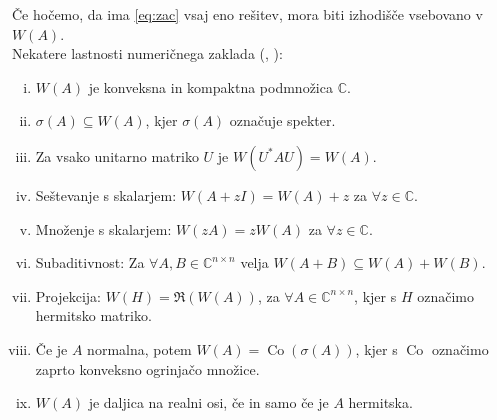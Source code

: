\documentclass[12pt,a4paper]{amsart}
\theoremstyle{definition}
\theoremstyle{plain}
\newcommand{\Co}{\operatorname{Co}} %
\newcommand{\C}{\mathbb C}
\begin{document}
Če hočemo, da ima \eqref{eq:zac} vsaj eno rešitev, mora biti izhodišče vsebovano v $W(A)$. \\

Nekatere lastnosti numeričnega zaklada (\cite{num}, \cite{zaloga}):
\begin{enumerate}[(i)]
\item $W(A)$ je konveksna in kompaktna podmnožica $\C$.
\item $\sigma(A)\subseteq W(A)$, kjer $\sigma(A)$ označuje spekter.
\item Za vsako unitarno matriko $U$ je $W(U^\ast AU)=W(A).$
\item Seštevanje s skalarjem: $W(A+zI)=W(A)+z$ za $\forall z \in \C$.
\item Množenje s skalarjem: $W(zA)=zW(A)$ za $\forall z \in \C$.
\item Subaditivnost: Za $\forall A, B \in \C^{n\times n}$ velja $W(A+B) \subseteq W(A) +W(B).$
\item Projekcija: $W(H)= \Re( W(A))$, za $\forall A\in \C^{n\times n}$, kjer s $H$ označimo hermitsko matriko.
\item Če je $A$ normalna, potem $W(A)=\Co(\sigma(A))$, kjer s $\Co$ označimo zaprto konveksno ogrinjačo množice.
\item $W(A)$ je daljica na realni osi, če in samo če je $A$ hermitska.
\end{enumerate}
\end{document}
